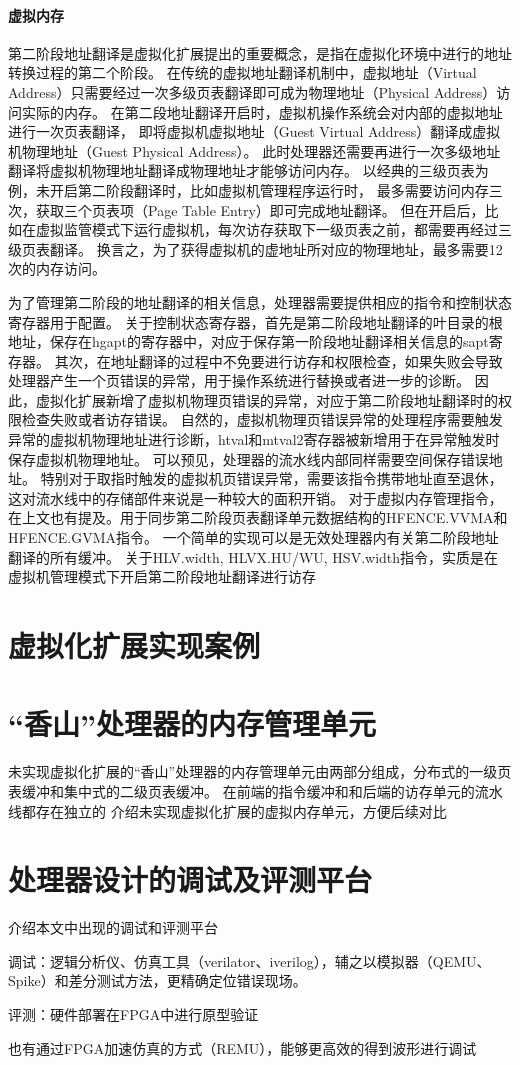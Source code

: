 \paragraph{虚拟内存}
第二阶段地址翻译是虚拟化扩展提出的重要概念，是指在虚拟化环境中进行的地址转换过程的第二个阶段。
在传统的虚拟地址翻译机制中，虚拟地址（Virtual Address）只需要经过一次多级页表翻译即可成为物理地址（Physical Address）访问实际的内存。
在第二段地址翻译开启时，虚拟机操作系统会对内部的虚拟地址进行一次页表翻译，
即将虚拟机虚拟地址（Guest Virtual Address）翻译成虚拟机物理地址（Guest Physical Address）。
此时处理器还需要再进行一次多级地址翻译将虚拟机物理地址翻译成物理地址才能够访问内存。
以经典的三级页表为例，未开启第二阶段翻译时，比如虚拟机管理程序运行时，
最多需要访问内存三次，获取三个页表项（Page Table Entry）即可完成地址翻译。
但在开启后，比如在虚拟监管模式下运行虚拟机，每次访存获取下一级页表之前，都需要再经过三级页表翻译。
换言之，为了获得虚拟机的虚地址所对应的物理地址，最多需要12次的内存访问。

为了管理第二阶段的地址翻译的相关信息，处理器需要提供相应的指令和控制状态寄存器用于配置。
关于控制状态寄存器，首先是第二阶段地址翻译的叶目录的根地址，保存在hgapt的寄存器中，对应于保存第一阶段地址翻译相关信息的sapt寄存器。
其次，在地址翻译的过程中不免要进行访存和权限检查，如果失败会导致处理器产生一个页错误的异常，用于操作系统进行替换或者进一步的诊断。
因此，虚拟化扩展新增了虚拟机物理页错误的异常，对应于第二阶段地址翻译时的权限检查失败或者访存错误。
自然的，虚拟机物理页错误异常的处理程序需要触发异常的虚拟机物理地址进行诊断，htval和mtval2寄存器被新增用于在异常触发时保存虚拟机物理地址。
可以预见，处理器的流水线内部同样需要空间保存错误地址。
特别对于取指时触发的虚拟机页错误异常，需要该指令携带地址直至退休，这对流水线中的存储部件来说是一种较大的面积开销。
对于虚拟内存管理指令，在上文也有提及。用于同步第二阶段页表翻译单元数据结构的HFENCE.VVMA和HFENCE.GVMA指令。
一个简单的实现可以是无效处理器内有关第二阶段地址翻译的所有缓冲。
关于HLV.width, HLVX.HU/WU, HSV.width指令，实质是在虚拟机管理模式下开启第二阶段地址翻译进行访存

\section{虚拟化扩展实现案例}

\section{“香山”处理器的内存管理单元}
未实现虚拟化扩展的“香山”处理器的内存管理单元由两部分组成，分布式的一级页表缓冲和集中式的二级页表缓冲。
在前端的指令缓冲和和后端的访存单元的流水线都存在独立的
介绍未实现虚拟化扩展的虚拟内存单元，方便后续对比

\section{处理器设计的调试及评测平台}
介绍本文中出现的调试和评测平台

调试：逻辑分析仪、仿真工具（verilator、iverilog），辅之以模拟器（QEMU、Spike）和差分测试方法，更精确定位错误现场。

评测：硬件部署在FPGA中进行原型验证

也有通过FPGA加速仿真的方式（REMU），能够更高效的得到波形进行调试